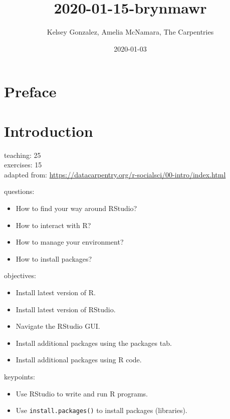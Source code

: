 \documentclass[]{book}
\title{2020-01-15-brynmawr}
\author{Kelsey Gonzalez, Amelia McNamara, The Carpentries}
\date{2020-01-03}
\providecommand{\tightlist}{%
  \setlength{\itemsep}{0pt}\setlength{\parskip}{0pt}}
\begin{document}
\maketitle

{
\setcounter{tocdepth}{1}
\tableofcontents
}
\chapter*{Preface}\label{preface}

\chapter{Introduction}\label{intro}

teaching: 25\\
exercises: 15\\
adapted from:
\url{https://datacarpentry.org/r-socialsci/00-intro/index.html}

questions:

\begin{itemize}
\tightlist
\item
  How to find your way around RStudio?\\
\item
  How to interact with R?\\
\item
  How to manage your environment?\\
\item
  How to install packages?
\end{itemize}

objectives:

\begin{itemize}
\tightlist
\item
  Install latest version of R.\\
\item
  Install latest version of RStudio.\\
\item
  Navigate the RStudio GUI.\\
\item
  Install additional packages using the packages tab.\\
\item
  Install additional packages using R code.
\end{itemize}

keypoints:

\begin{itemize}
\tightlist
\item
  Use RStudio to write and run R programs.\\
\item
  Use \texttt{install.packages()} to install packages (libraries).
\end{itemize}
\end{document}
